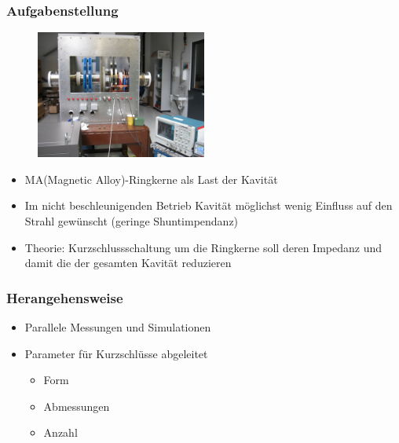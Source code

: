 \documentclass[accentcolor=tud9b, colorbacktitle, inverttitle]{tudbeamer}
\begin{document}
\begin{frame}\frametitle{Aufgabenstellung}
\vspace{-1em}
\begin{multicols}{2}
	\begin{figure}[h]
		\centering
		\includegraphics[width=0.5\textwidth]{Kavitaet}
	\end{figure}
	\vfill\null
	\columnbreak
	\begin{itemize}
		\item MA(Magnetic Alloy)-Ringkerne als Last der Kavit\"at
		\item Im nicht beschleunigenden Betrieb Kavit\"at m\"oglichst wenig Einfluss auf den Strahl gewünscht (geringe Shuntimpendanz)
		\item Theorie: Kurzschlussschaltung um die Ringkerne soll deren Impedanz und damit die der gesamten Kavität reduzieren
	\end{itemize}
\end{multicols}
\end{frame}


\begin{frame}\frametitle{Herangehensweise}
\begin{itemize}
	\item Parallele Messungen und Simulationen
	\item Parameter f\"ur Kurzschl\"usse abgeleitet
	\begin{itemize}
		\item Form
		\item Abmessungen
		\item Anzahl
	\end{itemize}
\end{itemize}
\end{frame}
\end{document}
